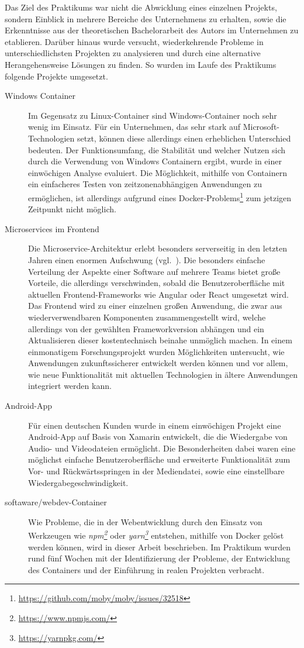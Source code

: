 Das Ziel des Praktikums war nicht die Abwicklung eines einzelnen Projekts, sondern Einblick in mehrere Bereiche des Unternehmens zu erhalten, sowie die Erkenntnisse aus der theoretischen Bachelorarbeit des Autors im Unternehmen zu etablieren.
Darüber hinaus wurde versucht, wiederkehrende Probleme in unterschiedlichsten Projekten zu analysieren und durch eine alternative Herangehensweise Lösungen zu finden.
So wurden im Laufe des Praktikums folgende Projekte umgesetzt.

\begin{description}
    \item [Windows Container]
    Im Gegensatz zu Linux-Container sind Windows-Container noch sehr wenig im Einsatz.
    Für ein Unternehmen, das sehr stark auf Microsoft-Tech\-no\-lo\-gien setzt, können diese allerdings einen erheblichen Unterschied bedeuten.
    Der Funktionsumfang, die Stabilität und welcher Nutzen sich durch die Verwendung von Windows Containern ergibt, wurde in einer einwöchigen Analyse evaluiert.
    Die Möglichkeit, mithilfe von Containern ein einfacheres Testen von zeitzonenabhängigen Anwendungen zu ermöglichen, ist allerdings aufgrund eines Docker-Problems\footnote{\url{https://github.com/moby/moby/issues/32518}} zum jetzigen Zeitpunkt nicht möglich.
    \item [Microservices im Frontend]
    Die Microservice-Architektur erlebt besonders serverseitig in den letzten Jahren einen enormen Aufschwung (vgl.~\autocite{Fowler.Microservices:online}).
    Die besonders einfache Verteilung der Aspekte einer Software auf mehrere Teams bietet große Vorteile, die allerdings verschwinden, sobald die Benutzeroberfläche mit aktuellen Frontend-Frameworks wie Angular oder React umgesetzt wird.
    Das Frontend wird zu einer einzelnen großen Anwendung, die zwar aus wiederverwendbaren Komponenten zusammengestellt wird, welche allerdings von der gewählten Frameworkversion abhängen und ein Aktualisieren dieser kostentechnisch beinahe unmöglich machen.
    In einem einmonatigem Forschungsprojekt wurden Möglichkeiten untersucht, wie Anwendungen zukunftssicherer entwickelt werden können und vor allem, wie neue Funktionalität mit aktuellen Technologien in ältere Anwendungen integriert werden kann.
    \item [Android-App]
    Für einen deutschen Kunden wurde in einem einwöchigen Projekt eine Android-App auf Basis von Xamarin entwickelt, die die Wiedergabe von Audio- und Videodateien ermöglicht.
    Die Besonderheiten dabei waren eine möglichst einfache Benutzeroberfläche und erweiterte Funktionalität zum Vor- und Rückwärtsspringen in der Mediendatei, sowie eine einstellbare Wiedergabegeschwindigkeit.
    \item [softaware/webdev-Container]
    Wie Probleme, die in der Webentwicklung durch den Einsatz von Werkzeugen wie \emph{npm\footnote{\url{https://www.npmjs.com/}}} oder \emph{yarn\footnote{\url{https://yarnpkg.com/}}} entstehen, mithilfe von Docker gelöst werden können, wird in dieser Arbeit beschrieben.
    Im Praktikum wurden rund fünf Wochen mit der Identifizierung der Probleme, der Entwicklung des Containers und der Einführung in realen Projekten verbracht.
\end{description}
